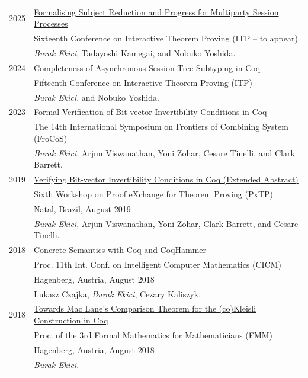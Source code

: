 \documentclass[a4paper,9pt]{article} %
\begin{document}
\begin{longtable}{ll}	
2025 & 
{\href{}{Formalising Subject Reduction and Progress for Multiparty Session Processes}} \\
& Sixteenth Conference on Interactive Theorem Proving (ITP -- to appear) \\
& \emph{Burak Ekici}, Tadayoshi Kamegai, and Nobuko Yoshida.
 \\[0.20cm]
2024 & 
{\href{https://drops.dagstuhl.de/entities/document/10.4230/LIPIcs.ITP.2024.13}{Completeness of Asynchronous Session Tree Subtyping in Coq}} \\
& Fifteenth Conference on Interactive Theorem Proving (ITP) \\
& \emph{Burak Ekici}, and Nobuko Yoshida.
 \\[0.20cm]
2023 & 
{\href{https://link.springer.com/chapter/10.1007/978-3-031-43369-6_3}{Formal Verification of Bit-vector Invertibility Conditions in Coq}} \\
& The 14th International Symposium on Frontiers of Combining System (FroCoS) \\
& \emph{Burak Ekici}, Arjun Viswanathan, Yoni Zohar, Cesare
Tinelli, and Clark Barrett.
 \\[0.20cm]
2019 & 
{\href{http://pxtp.gforge.inria.fr/2019/papers/PxTP_2019_paper_5.pdf}{Verifying Bit-vector Invertibility Conditions in Coq (Extended Abstract)}}\\
& Sixth Workshop on Proof eXchange for Theorem Proving (PxTP)\\
& Natal, Brazil, August 2019 \\
& \emph{Burak Ekici}, Arjun Viswanathan, Yoni Zohar, Clark Barrett, and Cesare
Tinelli.
 \\[0.20cm]
2018 & 
{\href{https://www.mimuw.edu.pl/~lukaszcz/cicm2018.pdf}{Concrete Semantics with Coq and CoqHammer}}\\ 
& Proc. 11th Int. Conf. on Intelligent Computer Mathematics (CICM)\\
& Hagenberg, Austria, August 2018\\
& Lukasz Czajka, \emph{Burak Ekici}, Cezary Kaliszyk.
 \\[0.20cm]
2018 & 
{\href{https://www.cicm-conference.org/2018/infproc/paper11.pdf}{Towards Mac Lane's Comparison Theorem for the (co)Kleisli Construction in Coq}}\\
& Proc. of the 3rd Formal Mathematics for Mathematicians (FMM) \\
& Hagenberg, Austria, August 2018 \\
& \emph{Burak Ekici}.

\end{longtable}
\end{document}
